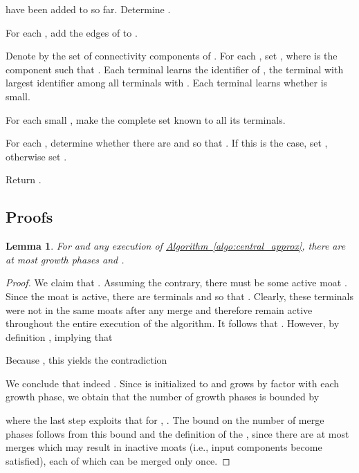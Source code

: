 \documentclass[letterpaper,11pt]{article}
\newtheorem{lemma}[theorem]{Lemma}
\newcommand{\namedref}[2]{\hyperref[#2]{#1~\ref*{#2}}}
\newcommand{\algref}[1]{\namedref{Algorithm}{#1}}
\begin{document}
\begin{compactenum}
\begin{compactenum}
have been added to  so far. Determine .
\item For each , add the edges of  to
.
\item Denote by  the set of connectivity components of . For
each , set , where  is the component
such that . Each terminal  learns the identifier of ,
the terminal with largest identifier among all terminals  with .
Each terminal  learns whether  is small.
\item For each small , make the complete set  known to all its
terminals.
\item For each , determine whether there are  and  so that . If this is the case, set
, otherwise set .
\end{compactenum}
\item Return .
\end{compactenum}

\subsection{Proofs}
\label{app:sublinear-analysis}
\begin{lemma}\label{lemma:number_merge_growth_phase}
For  and any execution of \algref{algo:central_approx},
there are at most  growth phases and
.
\end{lemma}
\begin{proof}We claim that . Assuming the
contrary, there must be some active moat . Since the moat
is active, there are terminals  and  so that
. Clearly, these terminals were not in the same moats after
any merge  and therefore remain active throughout the entire
execution of the algorithm. It follows that
.
However, by definition , implying that

Because , this yields the contradiction

We conclude that indeed . Since
 is initialized to  and grows by factor  with
each growth phase, we obtain that the number of growth phases is bounded by

where the last step exploits that for ,
. The bound on the number of merge
phases follows from this bound and the definition of the , since there are
at most  merges which may result in inactive moats (i.e., input components
become satisfied), each of which can be merged only once.
\end{proof}
\end{document}
